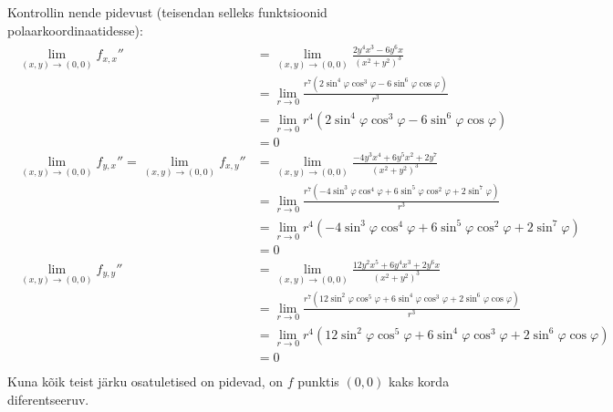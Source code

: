 \documentclass{article}
\begin{document}
Kontrollin nende pidevust (teisendan selleks funktsioonid polaarkoordinaatidesse):
\begin{gather*}
\begin{aligned}
\lim_{(x,y)\to(0,0)}f_{x,x}''&=\lim_{(x,y)\to(0,0)}\frac{2y^4x^3-6y^6x}{(x^2+y^2)^3}\\
&=\lim_{r\to 0}\frac{r^7(2\sin^4\varphi \cos^3\varphi-6\sin^6\varphi\cos\varphi)}{r^3}\\
&=\lim_{r\to 0}r^4(2\sin^4\varphi \cos^3\varphi-6\sin^6\varphi\cos\varphi)\\
&=0\\
\lim_{(x,y)\to(0,0)}f_{y,x}''=\lim_{(x,y)\to(0,0)}f_{x,y}''&=\lim_{(x,y)\to(0,0)}\frac{-4y^3x^4+6y^5x^2+2y^7}{(x^2+y^2)^3}\\
&=\lim_{r\to 0}\frac{r^7(-4\sin^3\varphi\cos^4\varphi+6\sin^5\varphi\cos^2\varphi+2\sin^7\varphi)}{r^3}\\
&=\lim_{r\to 0}r^4(-4\sin^3\varphi\cos^4\varphi+6\sin^5\varphi\cos^2\varphi+2\sin^7\varphi)\\
&=0\\
\lim_{(x,y)\to(0,0)}f_{y,y}''&=\lim_{(x,y)\to(0,0)}\frac{12y^2x^5+6y^4x^3+2y^6x}{(x^2+y^2)^3}\\
&=\lim_{r\to 0}\frac{r^7(12\sin^2\varphi\cos^5\varphi+6\sin^4\varphi\cos^3\varphi+2\sin^6\varphi\cos\varphi)}{r^3}\\
&=\lim_{r\to 0}r^4(12\sin^2\varphi\cos^5\varphi+6\sin^4\varphi\cos^3\varphi+2\sin^6\varphi\cos\varphi)\\
&=0\\
\end{aligned}
\end{gather*}
Kuna kõik teist järku osatuletised on pidevad, on $f$ punktis $(0,0)$ kaks korda diferentseeruv.\\
\end{document}
